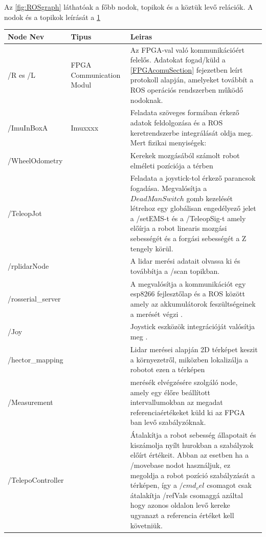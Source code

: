 Az \ref{fig:ROSgraph} láthatóak a főbb nodok, topikok és a köztük levő relációk. A nodok és a topikok leírását a \ref{Tab:nodok}

\begin{table}[H]
\centering
\begin{tabular}{lp{3cm}p{8cm}}
\hline Node Nev & Tipus & Leiras \\ \hline
  /R es /L      &  FPGA
  Communication
  Modul     &  Az FPGA-val való kommunikációért felelős. Adatokat fogad/küld  a \ref{FPGAcomuSection} fejezetben leírt protokoll alapján, amelyeket továbbít a ROS operációs rendszerben működő nodoknak.     \\
  /ImuInBoxA       &    Imuxxxx   &  Feladata szöveges formában érkező adatok feldolgozása és a ROS keretrendszerbe integrálását oldja meg. Mert fizikai menyiségek:       \\
  /WheelOdometry       &       &   Kerekek mozgásából számolt robot elméleti pozíciója a térben     \\
  /TeleopJot      &       & Feladata a joystick-tol érkező parancsok fogadása. Megvalósítja a $Dead Man Switch$ gomb kezelését létrehoz egy globálisan engedélyező jelet a /setEMS-t és a /TeleopSig-t amely előírja a robot linearis mozgási sebességét és a forgási sebességét a Z tengely körül.  \\
  /rplidarNode & & A lidar merési adatait olvassa ki és továbbítja a /scan topikban.\\
  /rosserial\_server & & A megvalósítja a kommunikációt egy esp8266 fejlesztőlap és a ROS között amely az akkumulátorok feszültségeinek a merését végzi \cite{RosSerial}.\\
  /Joy & & Joystick eszközök integrációját valósítja meg \cite{rosjoy}.\\
  /hector\_mapping & & Lidar merései alapján 2D térképet keszit a környezetről, miközben lokalizálja a robotot ezen a térképen \cite{roshectormap}\\
  /Measurement & & merésék elvégzésére szolgáló node, amely egy élőre beállított intervallumokban az megadat referenciaértékeket küld ki az FPGA ban levő szabályzóknak.\\
  /TelepoController & & Átalakítja a robot sebesség állapotait és kiszámolja nyílt hurokban a szabályzok előírt értékeit. Abban az esetben ha a /movebase nodot használjuk, ez megoldja a robot pozíció szabályzását a térképen, így a $/cmd_vel$ csomagot csak átalakítja /refVals csomaggá azáltal hogy azonos oldalon levő kereke ugyanazt a referencia értéket kell követniük.
  
\end{tabular}
 \label{Tab:nodok} 
\end{table}

